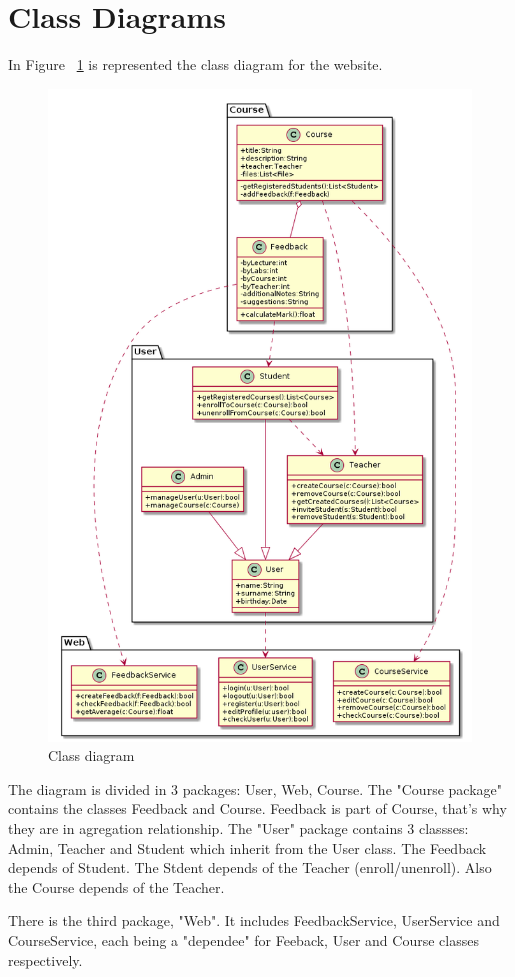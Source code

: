 \documentclass[12pt,a4paper,titlepage]{article}
\begin{document}
\section{Class Diagrams}
In Figure ~\ref{fig:class} is represented the class diagram for the website.
\begin{figure}[H]
	\centering
	\includegraphics[width=15cm]{class}
	\caption{Class diagram}
	\label{fig:class}
\end{figure}
The diagram is divided in 3 packages: User, Web, Course. The "Course package" contains the classes Feedback and Course. Feedback is part of Course, that's why they are in agregation relationship. The "User" package contains 3 classses: Admin, Teacher and Student which inherit from the User class. The Feedback depends of Student. The Stdent depends of the Teacher (enroll/unenroll). Also the Course depends of the Teacher.\par
There is the third package, "Web". It includes FeedbackService, UserService and CourseService, each being a "dependee" for Feeback, User and Course classes respectively.
\end{document}
